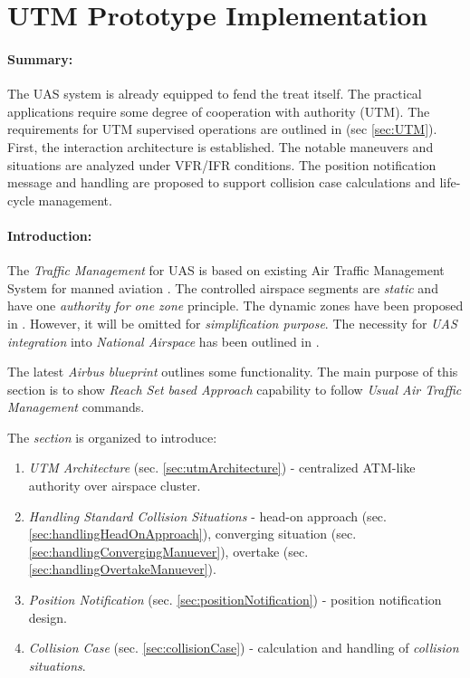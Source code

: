 \cleardoublepage
\section{UTM Prototype Implementation}\label{sec:UASTrafficManagement}

\paragraph{Summary:} The UAS system is already equipped to fend the treat itself. The practical applications require some degree of cooperation with authority (UTM). The requirements for UTM supervised operations are outlined in (sec \ref{sec:UTM}). First, the interaction architecture is established. The notable maneuvers and situations are analyzed under VFR/IFR conditions. The position notification message and handling are proposed to support collision case calculations and life-cycle management.

\paragraph{Introduction:} \noindent The \emph{Traffic Management} for UAS is based on existing Air Traffic Management System for manned aviation \cite{icao4444}. The controlled airspace segments are \emph{static} and have one \emph{authority for one zone} principle. The dynamic zones have been proposed in \cite{gerdes2016dynamic}. However, it will be omitted for \emph{simplification purpose}. The necessity for \emph{UAS integration} into \emph{National Airspace} has been outlined in \cite{spriesterbach2013unmanned}.

The latest \emph{Airbus blueprint} \cite{airbusUTM2018blueprint} outlines some functionality. The main purpose of this section is to show \emph{Reach Set based Approach} capability to follow \emph{Usual Air Traffic Management} commands.

The \emph{section} is organized to introduce:
\begin{enumerate}
    \item \emph{UTM Architecture} (sec. \ref{sec:utmArchitecture}) - centralized ATM-like authority over airspace cluster.
    
    \item \emph{Handling Standard Collision Situations} - head-on approach (sec. \ref{sec:handlingHeadOnApproach}), converging situation (sec. \ref{sec:handlingConvergingManuever}), overtake (sec. \ref{sec:handlingOvertakeManuever}).
    
    \item \emph{Position Notification} (sec. \ref{sec:positionNotification}) - position notification design.
    
    \item \emph{Collision Case} (sec. \ref{sec:collisionCase}) - calculation and handling of \emph{collision situations}.
    
\end{enumerate}

